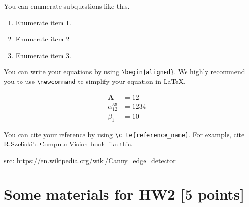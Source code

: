 \documentclass[12pt,a4paper]{article}
\newcommand{\Ab}{\bm{A}}
\begin{document}
You can enumerate subquestions like this.

\begin{enumerate}
    \item Enumerate item 1.
    \item Enumerate item 2.
    \item Enumerate item 3.
\end{enumerate}

You can write your equations by using \verb|\begin{aligned}|.
We highly recommend you to use \verb|\newcommand| to simplify your equation in \LaTeX.

\begin{align}
    \Ab &= 12 \\
    \alpha_{12}^{35} &= 1234 \\
    \beta_1 &= 10
\end{align}

You can cite your reference by using \verb|\cite{reference_name}|.
For example, cite R.Szeliski's Compute Vision book \cite{szeliski2010computer} like this.


src: 
https://en.wikipedia.org/wiki/Canny_edge_detector


\section{Some materials for HW2 [5 points]}
\end{document}
